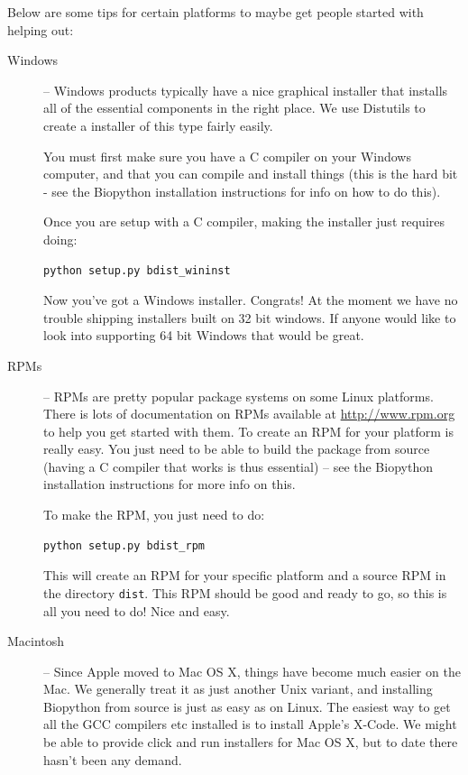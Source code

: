 \documentclass{report}
\begin{document}
Below are some tips for certain platforms to maybe get people started with helping out:

\begin{description}

\item[Windows] -- Windows products typically have a nice graphical installer that installs all of the essential components in the right place. We use Distutils to create a installer of this type fairly easily.

You must first make sure you have a C compiler on your Windows computer, and that you can compile and install things (this is the hard bit - see the Biopython installation instructions for info on how to do this).

Once you are setup with a C compiler, making the installer just requires doing:

\begin{verbatim}
python setup.py bdist_wininst
\end{verbatim}

Now you've got a Windows installer. Congrats!  At the moment we have no trouble shipping installers built on 32 bit windows.  If anyone would like to look into supporting 64 bit Windows that would be great.

  \item[RPMs] -- RPMs are pretty popular package systems on some Linux platforms. There is lots of documentation on RPMs available at \url{http://www.rpm.org} to help you get started with them. To create an RPM for your platform is really easy. You just need to be able to build the package from source (having a C compiler that works is thus essential) -- see the Biopython installation instructions for more info on this.

To make the RPM, you just need to do:

\begin{verbatim}
python setup.py bdist_rpm
\end{verbatim}

This will create an RPM for your specific platform and a source RPM in the directory \verb|dist|. This RPM should be good and ready to go, so this is all you need to do! Nice and easy.

\item[Macintosh] -- Since Apple moved to Mac OS X, things have become much easier on the Mac.  We generally
treat it as just another Unix variant, and installing Biopython from source is just as easy as on Linux.
The easiest way to get all the GCC compilers etc installed is to install Apple's X-Code.
We might be able to provide click and run installers for Mac OS X, but to date there hasn't been any demand.

\end{description}
\end{document}
